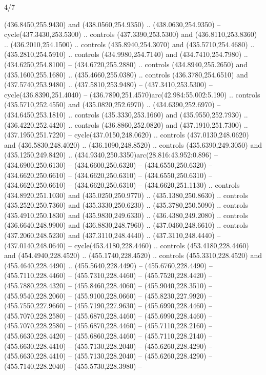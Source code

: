 \begin{flagdescription}{4/7}
\begin{scope}[shift={(0.5\flaglength,0.5\flagwidth)},scale=\flagwidth*\stretchfactor/820]
\begin{scope}[scale=1.87,xshift=-138mm,yshift=75mm]
\begin{scope}[y=0.8pt, x=0.8pt, yscale=-1, xscale=1]
\begin{scope}[fill=c816c2a]
  (436.8450,255.9430) and (438.0560,254.9350) .. (438.0630,254.9350) --
  cycle(437.3430,253.5300) .. controls (437.3390,253.5300) and
  (436.8110,253.8360) .. (436.2010,254.1500) .. controls (435.8940,254.3070) and
  (435.5710,254.4680) .. (435.2810,254.5910) .. controls (434.9980,254.7140) and
  (434.7410,254.7980) .. (434.6250,254.8100) -- (434.6720,255.2880) .. controls
  (434.8940,255.2650) and (435.1600,255.1680) .. (435.4660,255.0380) .. controls
  (436.3780,254.6510) and (437.5740,253.9480) .. (437.5810,253.9480) --
  (437.3410,253.5300) -- cycle(436.8390,251.4040) --
  (436.7890,251.4570)arc(42.984:55.002:5.190) .. controls (435.5710,252.4550)
  and (435.0820,252.6970) .. (434.6390,252.6970) -- (434.6450,253.1810) ..
  controls (435.3330,253.1660) and (435.9550,252.7930) .. (436.4220,252.4420) ..
  controls (436.8860,252.0820) and (437.1910,251.7300) .. (437.1950,251.7220) --
  cycle(437.0150,248.0620) .. controls (437.0130,248.0620) and
  (436.5830,248.4020) .. (436.1090,248.8520) .. controls (435.6390,249.3050) and
  (435.1250,249.8420) .. (434.9340,250.3350)arc(28.816:43.952:0.896) --
  (434.6900,250.6130) -- (434.6600,250.6320) -- (434.6550,250.6320) --
  (434.6620,250.6610) -- (434.6620,250.6310) -- (434.6550,250.6310) --
  (434.6620,250.6610) -- (434.6620,250.6310) -- (434.6620,251.1130) .. controls
  (434.8920,251.1030) and (435.0250,250.9770) .. (435.1380,250.8630) .. controls
  (435.2520,250.7360) and (435.3330,250.6230) .. (435.3780,250.5090) .. controls
  (435.4910,250.1830) and (435.9830,249.6330) .. (436.4380,249.2080) .. controls
  (436.6640,248.9900) and (436.8830,248.7960) .. (437.0460,248.6610) .. controls
  (437.2060,248.5230) and (437.3110,248.4440) .. (437.3110,248.4440) --
  (437.0140,248.0640) -- cycle(453.4180,228.4460) .. controls
  (453.4180,228.4460) and (454.4940,228.4520) .. (455.1740,228.4520) .. controls
  (455.3310,228.4520) and (455.4640,228.4490) .. (455.5640,228.4490) --
  (455.6760,228.4490) -- (455.7110,228.4460) -- (455.7310,228.4460) --
  (455.7520,228.4420) -- (455.7880,228.4320) -- (455.8460,228.4060) --
  (455.9040,228.3510) -- (455.9540,228.2060) -- (455.9100,228.0660) --
  (455.8230,227.9920) -- (455.7550,227.9660) -- (455.7190,227.9630) --
  (455.6990,228.4460) -- (455.7070,228.2580) -- (455.6870,228.4460) --
  (455.6990,228.4460) -- (455.7070,228.2580) -- (455.6870,228.4460) --
  (455.7110,228.2160) -- (455.6630,228.4420) -- (455.6860,228.4460) --
  (455.7110,228.2140) -- (455.6630,228.4410) -- (455.7130,228.2040) --
  (455.6260,228.4290) -- (455.6630,228.4410) -- (455.7130,228.2040) --
  (455.6260,228.4290) -- (455.7140,228.2040) -- (455.5730,228.3980) --

\end{scope}
\end{scope}
\end{scope}
\end{scope}
\end{flagdescription}
